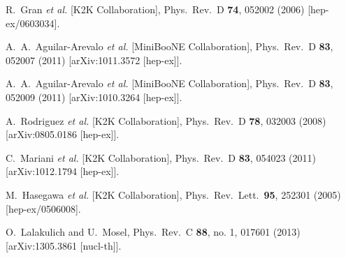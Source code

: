 \documentclass[%
reprint,
superscriptaddress,
 amsmath,amssymb,
 aps,
floatfix,
]{revtex4-1}
\begin{document}
\begin{thebibliography}{99}
  R.~Gran {\it et al.}  [K2K Collaboration],
  Phys.\ Rev.\ D {\bf 74}, 052002 (2006)
  [hep-ex/0603034].

  A.~A.~Aguilar-Arevalo {\it et al.}  [MiniBooNE Collaboration],
  Phys.\ Rev.\ D {\bf 83}, 052007 (2011)
  [arXiv:1011.3572 [hep-ex]].


  A.~A.~Aguilar-Arevalo {\it et al.}  [MiniBooNE Collaboration],
  Phys.\ Rev.\ D {\bf 83}, 052009 (2011)
  [arXiv:1010.3264 [hep-ex]].


  A.~Rodriguez {\it et al.}  [K2K Collaboration],
  Phys.\ Rev.\ D {\bf 78}, 032003 (2008)
  [arXiv:0805.0186 [hep-ex]].

  C.~Mariani {\it et al.}  [K2K Collaboration],
  Phys.\ Rev.\ D {\bf 83}, 054023 (2011)
  [arXiv:1012.1794 [hep-ex]].

  M.~Hasegawa {\it et al.}  [K2K Collaboration],
  Phys.\ Rev.\ Lett.\  {\bf 95}, 252301 (2005)
  [hep-ex/0506008].

  O.~Lalakulich and U.~Mosel,
  Phys.\ Rev.\ C {\bf 88}, no. 1, 017601 (2013)
  [arXiv:1305.3861 [nucl-th]].


\end{thebibliography}
\end{document}
